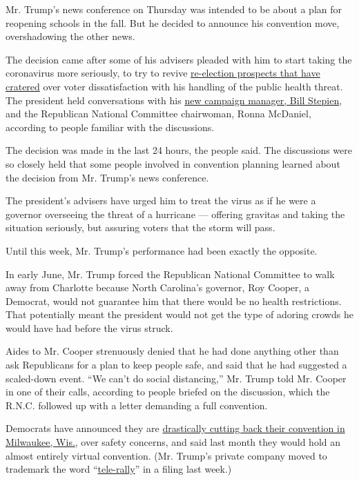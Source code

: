 Mr. Trump's news conference on Thursday was intended to be about a plan
for reopening schools in the fall. But he decided to announce his
convention move, overshadowing the other news.

The decision came after some of his advisers pleaded with him to start
taking the coronavirus more seriously, to try to revive
\href{https://www.nytimes3xbfgragh.onion/2020/06/24/us/politics/trump-biden-poll-nyt-upshot-siena-college.html}{re-election
prospects that have cratered} over voter dissatisfaction with his
handling of the public health threat. The president held conversations
with his
\href{https://www.nytimes3xbfgragh.onion/article/bill-stepien.html}{new
campaign manager, Bill Stepien}, and the Republican National Committee
chairwoman, Ronna McDaniel, according to people familiar with the
discussions.

The decision was made in the last 24 hours, the people said. The
discussions were so closely held that some people involved in convention
planning learned about the decision from Mr. Trump's news conference.

The president's advisers have urged him to treat the virus as if he were
a governor overseeing the threat of a hurricane --- offering gravitas
and taking the situation seriously, but assuring voters that the storm
will pass.

Until this week, Mr. Trump's performance had been exactly the opposite.

In early June, Mr. Trump forced the Republican National Committee to
walk away from Charlotte because North Carolina's governor, Roy Cooper,
a Democrat, would not guarantee him that there would be no health
restrictions. That potentially meant the president would not get the
type of adoring crowds he would have had before the virus struck.

Aides to Mr. Cooper strenuously denied that he had done anything other
than ask Republicans for a plan to keep people safe, and said that he
had suggested a scaled-down event. ``We can't do social distancing,''
Mr. Trump told Mr. Cooper in one of their calls, according to people
briefed on the discussion, which the R.N.C. followed up with a letter
demanding a full convention.

Democrats have announced they are
\href{https://www.nytimes3xbfgragh.onion/2020/07/17/us/politics/democratic-convention-milwaukee.html}{drastically
cutting back their convention in Milwaukee, Wis.}, over safety concerns,
and said last month they would hold an almost entirely virtual
convention. (Mr. Trump's private company moved to trademark the word
``\href{https://www.washingtonpost.com/politics/trumps-company-applied-to-trademark-telerally-then-president-trump-held-a-tele-rally/2020/07/22/0adca60e-cb7f-11ea-bc6a-6841b28d9093_story.html}{tele-rally}''
in a filing last week.)

